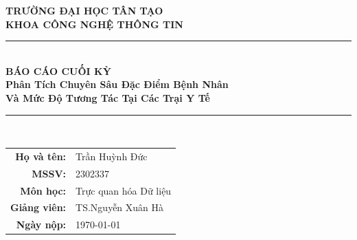 \documentclass[12pt,a4paper]{article}
\newcommand{\highlight}[1]{\textcolor{primary}{\textbf{#1}}}
\begin{document}
\begin{titlepage}
    \centering
    
    
    \vspace*{2cm}
    
    {\large \textcolor{primary}{\textbf{TRƯỜNG ĐẠI HỌC TÂN TẠO}}} \\
    {\large \textcolor{primary}{\textbf{KHOA CÔNG NGHỆ THÔNG TIN}}} \\
    \vspace{0.5cm}

    
    \vspace{2cm}
    
    \textcolor{primary}{\rule{\linewidth}{2pt}} \\[0.8cm]
    
    {\Huge \textbf{BÁO CÁO CUỐI KỲ}} \\[0.8cm]
    {\Large \textbf{Phân Tích Chuyên Sâu Đặc Điểm Bệnh Nhân}} \\
    {\Large \textbf{Và Mức Độ Tương Tác Tại Các Trại Y Tế}} \\[0.8cm]
    
    \textcolor{primary}{\rule{\linewidth}{2pt}} \\[2cm]
    
    \begin{minipage}[t]{0.6\textwidth}
        \centering
        \large
        \begin{tabular}{rl}
            \highlight{Họ và tên:} & Trần Huỳnh Đức \\
            \highlight{MSSV:} & 2302337 \\
            \highlight{Môn học:} & Trực quan hóa Dữ liệu \\
            \highlight{Giảng viên:} & TS.Nguyễn Xuân Hà \\
            \highlight{Ngày nộp:} & \today \\
        \end{tabular}
    \end{minipage}
    
    \vfill
    
    
\end{titlepage}
\end{document}
